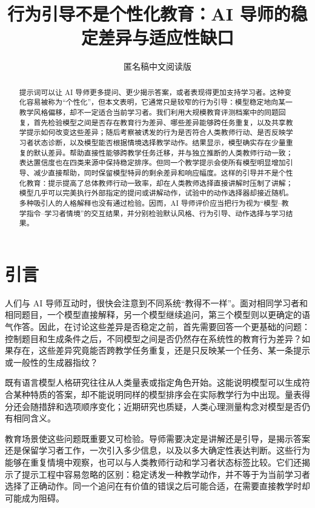 \documentclass[11pt,a4paper,UTF8]{ctexart}
\title{行为引导不是个性化教育：AI 导师的稳定差异与适应性缺口}
\author{匿名稿中文阅读版}
\date{}
\begin{document}
\maketitle

\begin{abstract}
提示词可以让 AI 导师更多提问、更少揭示答案，或者表现得更加支持学习者。这种变化容易被称为“个性化”，但本文表明，它通常只是较窄的行为引导：模型稳定地向某一教学风格偏移，却不一定适合当前学习者。我们利用大规模教育评测档案中的同题回复，首先检验模型之间是否存在教育行为差异、哪些差异能够跨任务重复，以及共享教学提示如何改变这些差异；随后考察被诱发的行为是否符合人类教师行动、是否反映学习者状态诊断，以及模型能否根据情境选择教学动作。结果显示，模型确实存在少量重复的默认差异。帮助直接性能够跨教学任务迁移，并与独立推断的人类教师行动一致；表达置信度也在四类来源中保持稳定排序。但同一个教学提示会使所有模型明显增加引导、减少直接帮助，同时保留模型特异的剩余差异和响应幅度。这样的引导并不是个性化教育：提示提高了总体教师行动一致率，却在人类教师选择直接讲解时压制了讲解；模型几乎可以完美执行外部指定的提问或讲解动作，试验中的动作选择器却接近随机。多种吸引人的人格解释也没有通过检验。因而，AI 导师评价应当把行为视为“模型--教学指令--学习者情境”的交互结果，并分别检验默认风格、行为引导、动作选择与学习结果。
\end{abstract}

\section{引言}

人们与 AI 导师互动时，很快会注意到不同系统“教得不一样”。面对相同学习者和相同题目，一个模型直接解释，另一个模型继续追问，第三个模型则以更确定的语气作答。因此，在讨论这些差异是否稳定之前，首先需要回答一个更基础的问题：控制题目和生成条件之后，不同模型之间是否仍然存在系统性的教育行为差异？如果存在，这些差异究竟能否跨教学任务重复，还是只反映某一个任务、某一条提示或一般性的生成器指纹？

既有语言模型人格研究往往从人类量表或指定角色开始\citep{jiang-etal-2024-personallm,lee-etal-2025-trait}。这能说明模型可以生成符合某种特质的答案，却不能说明同样的模型排序会在实际教学行为中出现。量表得分还会随措辞和选项顺序变化\citep{shu-etal-2024-dont}；近期研究也质疑，人类心理测量构念对模型是否仍有相同含义\citep{han-etal-2025-personality-illusion,zierahn-etal-2026-arent-human,contreras-2026-native-psychometric}。

教育场景使这些问题既重要又可检验。导师需要决定是讲解还是引导，是揭示答案还是保留学习者工作，一次引入多少信息，以及以多大确定性表达判断。这些行为能够在重复情境中观察，也可以与人类教师行动和学习者状态标签比较。它们还揭示了提示工程中容易忽略的区别：稳定诱发一种教学动作，并不等于为当前学习者选择了正确动作。同一个追问在有价值的错误之后可能合适，在需要直接教学时却可能成为阻碍。
\end{document}
